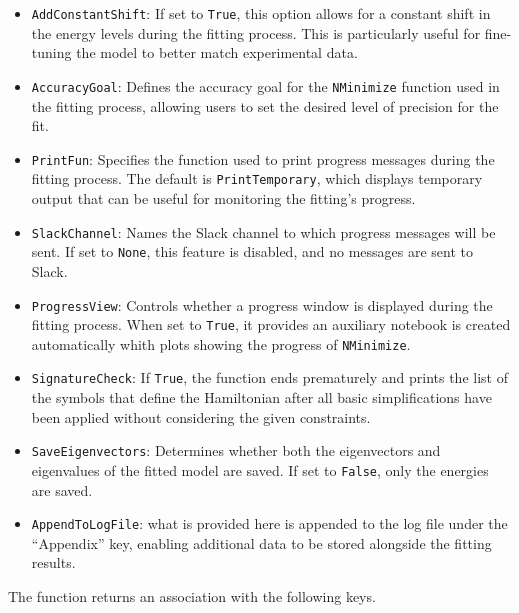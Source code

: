\documentclass{article}
\newcommand{\codetext}[1]{{\color{BlueViolet} \texttt{#1}}}
\begin{document}
\begin{itemize}
	\item \codetext{AddConstantShift}: If set to \codetext{True}, this option allows for a constant shift in the energy levels during the fitting process. This is particularly useful for fine-tuning the model to better match experimental data.
	
	\item \codetext{AccuracyGoal}: Defines the accuracy goal for the \codetext{NMinimize} function used in the fitting process, allowing users to set the desired level of precision for the fit.
	
	\item \codetext{PrintFun}: Specifies the function used to print progress messages during the fitting process. The default is \codetext{PrintTemporary}, which displays temporary output that can be useful for monitoring the fitting's progress.
	
	\item \codetext{SlackChannel}: Names the Slack channel to which progress messages will be sent. If set to \codetext{None}, this feature is disabled, and no messages are sent to Slack.
	
	\item \codetext{ProgressView}: Controls whether a progress window is displayed during the fitting process. When set to \codetext{True}, it provides an auxiliary notebook is created automatically whith plots showing the progress of \codetext{NMinimize}.
	
	\item \codetext{SignatureCheck}: If \codetext{True}, the function ends prematurely and prints the  list of the symbols that define the Hamiltonian after all basic simplifications have been applied without considering the given constraints.
	
	\item \codetext{SaveEigenvectors}: Determines whether both the eigenvectors and eigenvalues of the fitted model are saved. If set to \codetext{False}, only the energies are saved.
	
	\item \codetext{AppendToLogFile}: what is provided here is appended to the log file under the ``Appendix'' key, enabling additional data to be stored alongside the fitting results.
\end{itemize}

The function returns an association with the following keys.
\end{document}
